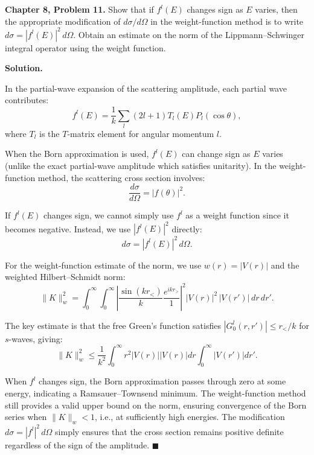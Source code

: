 \documentclass[12pt]{article}
\begin{document}
\textbf{Chapter 8, Problem 11.} Show that if $f^l(E)$ changes sign as $E$ varies, then the appropriate modification of $d\sigma/d\Omega$ in the weight-function method is to write $d\sigma = |f^l(E)|^2\,d\Omega$. Obtain an estimate on the norm of the Lippmann--Schwinger integral operator using the weight function.

\bigskip
\textbf{Solution.}

In the partial-wave expansion of the scattering amplitude, each partial wave contributes:
\[
f^l(E) = \frac{1}{k}\sum_l (2l+1)T_l(E)P_l(\cos\theta),
\]
where $T_l$ is the $T$-matrix element for angular momentum $l$.

When the Born approximation is used, $f^l(E)$ can change sign as $E$ varies (unlike the exact partial-wave amplitude which satisfies unitarity). In the weight-function method, the scattering cross section involves:
\[
\frac{d\sigma}{d\Omega} = |f(\theta)|^2.
\]

If $f^l(E)$ changes sign, we cannot simply use $f^l$ as a weight function since it becomes negative. Instead, we use $|f^l(E)|^2$ directly:
\[
d\sigma = |f^l(E)|^2\,d\Omega.
\]

For the weight-function estimate of the norm, we use $w(r) = |V(r)|$ and the weighted Hilbert--Schmidt norm:
\[
\|K\|_w^2 = \int_0^\infty\!\!\int_0^\infty \left|\frac{\sin(kr_<)}{k}\frac{e^{ikr_>}}{1}\right|^2|V(r)|^2\,|V(r')|\,dr\,dr'.
\]

The key estimate is that the free Green's function satisfies $|G_0^l(r,r')| \le r_</k$ for $s$-waves, giving:
\[
\|K\|_w^2 \le \frac{1}{k^2}\int_0^\infty r^2|V(r)||V(r)|dr\int_0^\infty|V(r')|dr'.
\]

When $f^l$ changes sign, the Born approximation passes through zero at some energy, indicating a Ramsauer--Townsend minimum. The weight-function method still provides a valid upper bound on the norm, ensuring convergence of the Born series when $\|K\|_w < 1$, i.e., at sufficiently high energies. The modification $d\sigma = |f^l|^2\,d\Omega$ simply ensures that the cross section remains positive definite regardless of the sign of the amplitude. $\blacksquare$
\end{document}
